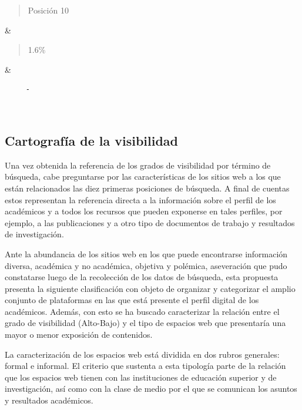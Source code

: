 \documentclass[
  spanish,
  11pt,
  a4paper,
]{scrbook}
\begin{document}
\begin{longtable}[]
\begin{minipage}[t]{\linewidth}\raggedright
\begin{quote}
Posición 10
\end{quote}
\end{minipage} & \begin{minipage}[t]{\linewidth}\raggedright
\begin{quote}
1.6\%
\end{quote}
\end{minipage} & \begin{minipage}[t]{\linewidth}\raggedright
\begin{verbatim}
     -
\end{verbatim}
\end{minipage} \\
\end{longtable}

\endgroup

\subsection*{Cartografía de la
visibilidad}\label{cartografuxeda-de-la-visibilidad}

Una vez obtenida la referencia de los grados de visibilidad por término
de búsqueda, cabe preguntarse por las características de los sitios web
a los que están relacionados las diez primeras posiciones de búsqueda. A
final de cuentas estos representan la referencia directa a la
información sobre el perfil de los académicos y a todos los recursos que
pueden exponerse en tales perfiles, por ejemplo, a las publicaciones y a
otro tipo de documentos de trabajo y resultados de investigación.

Ante la abundancia de los sitios web en los que puede encontrarse
información diversa, académica y no académica, objetiva y polémica,
aseveración que pudo constatarse luego de la recolección de los datos de
búsqueda, esta propuesta presenta la siguiente clasificación con objeto
de organizar y categorizar el amplio conjunto de plataformas en las que
está presente el perfil digital de los académicos. Además, con esto se
ha buscado caracterizar la relación entre el grado de visibilidad
(Alto-Bajo) y el tipo de espacios web que presentaría una mayor o menor
exposición de contenidos.

La caracterización de los espacios web está dividida en dos rubros
generales: formal e informal. El criterio que sustenta a esta tipología
parte de la relación que los espacios web tienen con las instituciones
de educación superior y de investigación, así como con la clase de medio
por el que se comunican los asuntos y resultados académicos.
\end{document}

